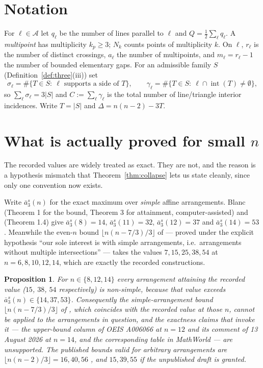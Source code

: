 \documentclass[11pt]{article}
\newtheorem{proposition}[theorem]{Proposition}
\theoremstyle{definition}
\newcommand{\Nk}{N_k}
\newcommand{\intr}{\operatorname{int}}
\begin{document}
\section{Notation}

For $\ell\in\mathcal A$ let $q_\ell$ be the number of lines parallel to
$\ell$ and $Q=\frac12\sum_\ell q_\ell$. A \emph{multipoint} has multiplicity
$k_p\ge3$; $\Nk$ counts points of multiplicity $k$. On $\ell$, $r_\ell$ is
the number of distinct crossings, $a_\ell$ the number of multipoints, and
$m_\ell=r_\ell-1$ the number of bounded elementary gaps. For an admissible
family $S$ (Definition~\ref{def:three}(iii)) set
\[
 \sigma_\ell=\#\{T\in S:\ \ell\text{ supports a side of }T\},\qquad
 \gamma_\ell=\#\{T\in S:\ \ell\cap\intr(T)\ne\emptyset\},
\]
so $\sum_\ell\sigma_\ell=3|S|$ and $C:=\sum_\ell\gamma_\ell$ is the total
number of line/triangle interior incidences. Write $T=|S|$ and
$\Delta=n(n-2)-3T$.

\section{What is actually proved for small $n$}\label{sec:actual}

The recorded values are widely treated as exact. They are not, and the
reason is a hypothesis mismatch that Theorem~\ref{thm:collapse} lets us state
cleanly, since only one convention now exists.

Write $\bar a_3^s(n)$ for the exact maximum over \emph{simple} affine
arrangements. Blanc \cite{Blanc} (Theorem 1 for the bound, Theorem 3 for
attainment, computer-assisted) and \cite{BBL} (Theorem 1.4) give
$\bar a_3^s(8)=14$, $\bar a_3^s(11)=32$, $\bar a_3^s(12)=37$ and
$\bar a_3^s(14)=53$. Meanwhile the even-$n$ bound $\lfloor
n(n-7/3)/3\rfloor$ of \cite[Thm.~1.1]{BBL} --- proved under the explicit
hypothesis ``our sole interest is with simple arrangements, i.e.\
arrangements without multiple intersections'' --- takes the values
$7,15,25,38,54$ at $n=6,8,10,12,14$, which are exactly the recorded
constructions.

\begin{proposition}\label{prop:mismatch}
For $n\in\{8,12,14\}$ every arrangement attaining the recorded value
($15$, $38$, $54$ respectively) is non-simple, because that value exceeds
$\bar a_3^s(n)\in\{14,37,53\}$. Consequently the simple-arrangement bound
$\lfloor n(n-7/3)/3\rfloor$ of \cite[Thm.~1.1]{BBL}, which coincides with the
recorded value at those $n$, cannot be applied to the arrangements in
question, and the exactness claims that invoke it --- the upper-bound column
of OEIS A006066 \cite{OEIS} at $n=12$ and its comment of 13 August 2026 at
$n=14$, and the corresponding table in MathWorld \cite{MW} --- are
unsupported. The published bounds valid for arbitrary arrangements are
$\lfloor n(n-2)/3\rfloor=16,40,56$ \cite{FK1999}, and $15,39,55$ if the
unpublished draft \cite{CB2007} is granted.
\end{proposition}
\end{document}
